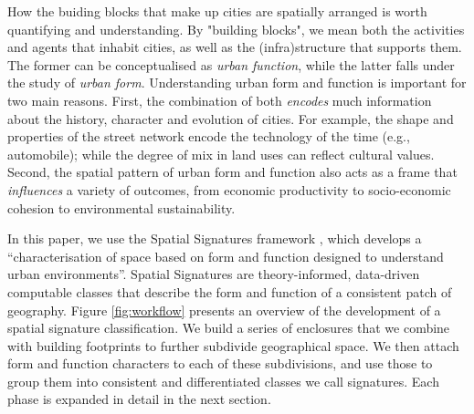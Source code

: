 


How the buiding blocks that make up cities are spatially arranged is worth
quantifying and understanding.
By "building blocks", we mean both the activities and agents that inhabit
cities, as well as the (infra)structure that supports them. The
former can be conceptualised as \textit{urban function}, while the latter
falls under the study of \textit{urban form}.
Understanding urban form and function is important for two main reasons.
First, the combination of both \textit{encodes} much information about the
history, character and evolution of cities.
%
For example, the shape and properties of the street network encode the technology of the
time (e.g., automobile); while the degree of mix in land uses can reflect
cultural values.
Second, the spatial pattern of urban form and function also acts as a
frame that \textit{influences} a variety of outcomes, from economic
productivity to socio-economic cohesion to environmental sustainability.

In this paper, we use the Spatial Signatures framework \cite{dab_mf_2021a, dab_mf_2021b},
which develops a ``characterisation of space based on form and function
designed to understand urban environments''\cite{dab_mf_2021a}.
Spatial Signatures are theory-informed, data-driven computable classes that
describe the form and function of a consistent patch of geography.
%
Figure \ref{fig:workflow} presents an overview of the development of a spatial
signature classification.
%
We build a series of enclosures that we combine with building footprints
to further subdivide geographical space. We then attach form and function
characters to each of these subdivisions, and use those to group them into
consistent and differentiated classes we call signatures.
%
Each phase is expanded in detail in the next section.

